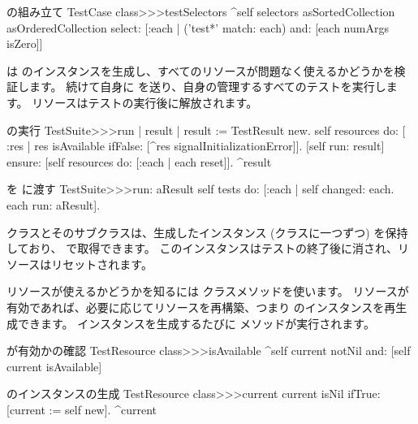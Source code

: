\documentclass[a4paper,10pt,twoside]{book}
\begin{document}
\begin{method}[testcasetestselectors]{ の組み立て}
TestCase class>>>testSelectors 
	^self selectors asSortedCollection asOrderedCollection select: [:each | 
		('test*' match: each) and: [each numArgs isZero]]
\end{method}

 は  のインスタンスを生成し、すべてのリソースが問題なく使えるかどうかを検証します。
続けて自身に  を送り、自身の管理するすべてのテストを実行します。
リソースはテストの実行後に解放されます。

\begin{method}[testsuiterun]{ の実行}
TestSuite>>>run
	| result |
 	result := TestResult new.
	self resources do: [ :res |
		res isAvailable ifFalse: [^res signalInitializationError]].
	[self run: result] ensure: [self resources do: [:each | each reset]].
	^result
\end{method}

\begin{method}[testsuiterun:]{ を  に渡す}
TestSuite>>>run: aResult
	self tests do: [:each | 
		self changed: each.
		each run: aResult].
\end{method}

 クラスとそのサブクラスは、生成したインスタンス (クラスに一つずつ) を保持しており、  で取得できます。
このインスタンスはテストの終了後に消され、リソースはリセットされます。

リソースが使えるかどうかを知るには  クラスメソッドを使います。
リソースが有効であれば、必要に応じてリソースを再構築、つまり  のインスタンスを再生成できます。
インスタンスを生成するたびに  メソッドが実行されます。

\begin{method}[testresourceisavailable]{ が有効かの確認}
TestResource class>>>isAvailable
	^self current notNil and: [self current isAvailable]
\end{method}

\begin{method}[testresourcecurrent]{ のインスタンスの生成}
TestResource class>>>current
	current isNil ifTrue: [current := self new].
	^current
\end{method}
\end{document}
